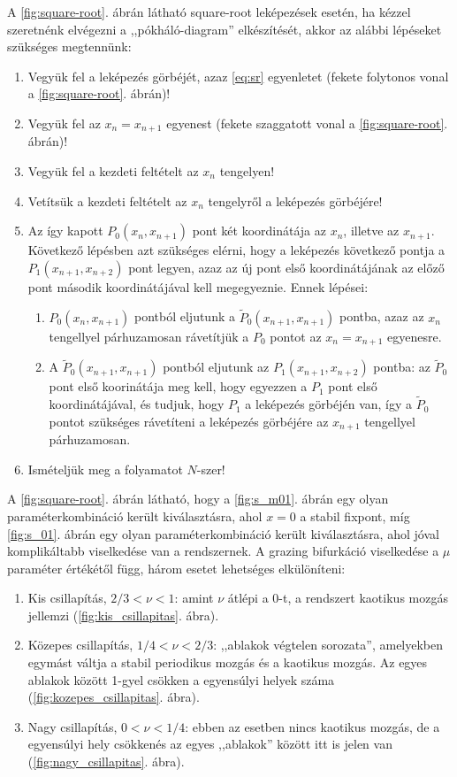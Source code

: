 A \ref{fig:square-root}. ábrán látható square-root leképezések esetén, ha kézzel szeretnénk elvégezni a ,,pókháló-diagram'' elkészítését, akkor az alábbi lépéseket szükséges megtennünk:
\begin{enumerate}
\item Vegyük fel a leképezés görbéjét, azaz \eqref{eq:sr} egyenletet (fekete folytonos vonal a \ref{fig:square-root}. ábrán)!
\item Vegyük fel az $x_n=x_{n+1}$ egyenest (fekete szaggatott vonal a \ref{fig:square-root}. ábrán)!
\item Vegyük fel a kezdeti feltételt az $x_n$ tengelyen!
\item Vetítsük a kezdeti feltételt az $x_n$ tengelyről a leképezés görbéjére!
\item Az így kapott $P_0(x_{n},x_{n+1})$ pont két koordinátája az $x_n$, illetve az $x_{n+1}$. Következő lépésben azt szükséges elérni, hogy a leképezés következő pontja a $P_1(x_{n+1},x_{n+2})$ pont legyen, azaz az új pont első koordinátájának az előző pont második koordinátájával kell megegyeznie. Ennek lépései: 
\begin{enumerate}
\item $P_0(x_{n},x_{n+1})$ pontból eljutunk a $\tilde{P}_0(x_{n+1},x_{n+1})$ pontba, azaz az $x_n$ tengellyel párhuzamosan rávetítjük a $P_0$ pontot az $x_n=x_{n+1}$ egyenesre.
\item A $\tilde{P}_0(x_{n+1},x_{n+1})$ pontból eljutunk az $P_1(x_{n+1},x_{n+2})$ pontba: az $\tilde{P}_0$ pont első koorinátája meg kell, hogy egyezzen a $P_1$ pont első koordinátájával, és tudjuk, hogy $P_1$ a leképezés görbéjén van, így a $\tilde{P}_0$ pontot szükséges rávetíteni a leképezés görbéjére az $x_{n+1}$ tengellyel párhuzamosan.
\end{enumerate} 
\item Ismételjük meg a folyamatot $N$-szer!
\end{enumerate}

A \ref{fig:square-root}. ábrán látható, hogy a \ref{fig:s_m01}. ábrán egy olyan paraméterkombináció került kiválasztásra, ahol $x=0$ a stabil fixpont, míg \ref{fig:s_01}. ábrán egy olyan paraméterkombináció került kiválasztásra, ahol jóval komplikáltabb viselkedése van a rendszernek. A grazing bifurkáció viselkedése a $\mu$ paraméter értékétől függ, három esetet lehetséges elkülöníteni:
\begin{enumerate}
\item Kis csillapítás, $2/3<\nu<1$: amint $\nu$ átlépi a 0-t, a rendszert kaotikus mozgás jellemzi (\ref{fig:kis_csillapitas}. ábra).
\item Közepes csillapítás, $1/4<\nu<2/3$: ,,ablakok végtelen sorozata'', amelyekben egymást váltja a stabil periodikus mozgás és a kaotikus mozgás. Az egyes ablakok között 1-gyel csökken a egyensúlyi helyek száma (\ref{fig:kozepes_csillapitas}. ábra).
\item Nagy csillapítás, $0<\nu<1/4$: ebben az esetben nincs kaotikus mozgás, de a egyensúlyi hely csökkenés az egyes ,,ablakok'' között itt is jelen van  (\ref{fig:nagy_csillapitas}. ábra).
\end{enumerate}


